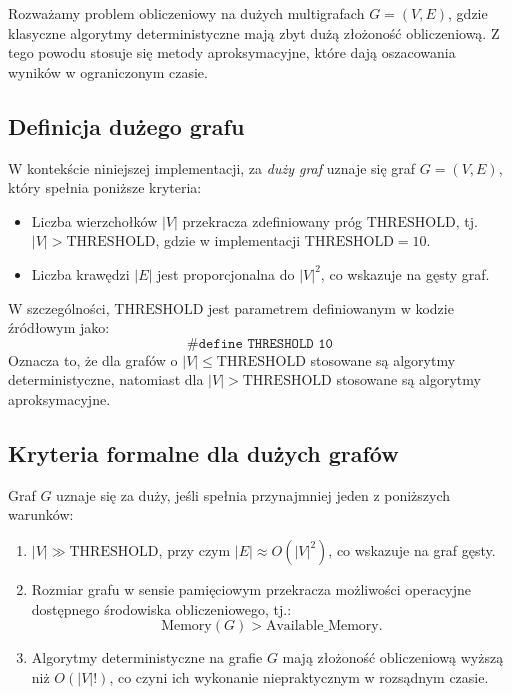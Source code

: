 Rozważamy problem obliczeniowy na dużych multigrafach \( G = (V, E) \), gdzie klasyczne algorytmy deterministyczne mają zbyt dużą złożoność obliczeniową. Z tego powodu stosuje się metody aproksymacyjne, które dają oszacowania wyników w ograniczonym czasie.

\subsection{Definicja dużego grafu}

W kontekście niniejszej implementacji, za \emph{duży graf} uznaje się graf \( G = (V, E) \), który spełnia poniższe kryteria:

\begin{itemize}
    \item Liczba wierzchołków \( |V| \) przekracza zdefiniowany próg \( \text{THRESHOLD} \), tj. \( |V| > \text{THRESHOLD} \), gdzie w implementacji \( \text{THRESHOLD} = 10 \).
    \item Liczba krawędzi \( |E| \) jest proporcjonalna do \( |V|^2 \), co wskazuje na gęsty graf.
\end{itemize}

\noindent W szczególności, \( \text{THRESHOLD} \) jest parametrem definiowanym w kodzie źródłowym jako:
\[
\texttt{\#define THRESHOLD 10}
\]
Oznacza to, że dla grafów o \( |V| \leq \text{THRESHOLD} \) stosowane są algorytmy deterministyczne, natomiast dla \( |V| > \text{THRESHOLD} \) stosowane są algorytmy aproksymacyjne.

\subsection{Kryteria formalne dla dużych grafów}

Graf \( G \) uznaje się za duży, jeśli spełnia przynajmniej jeden z poniższych warunków:
\begin{enumerate}
    \item \( |V| \gg \text{THRESHOLD} \), przy czym \( |E| \approx O(|V|^2) \), co wskazuje na graf gęsty.
    \item Rozmiar grafu w sensie pamięciowym przekracza możliwości operacyjne dostępnego środowiska obliczeniowego, tj.:
    \[
    \text{Memory}(G) > \text{Available\_Memory}.
    \]
    \item Algorytmy deterministyczne na grafie \( G \) mają złożoność obliczeniową wyższą niż \( O(|V|!) \), co czyni ich wykonanie niepraktycznym w rozsądnym czasie.
\end{enumerate}

